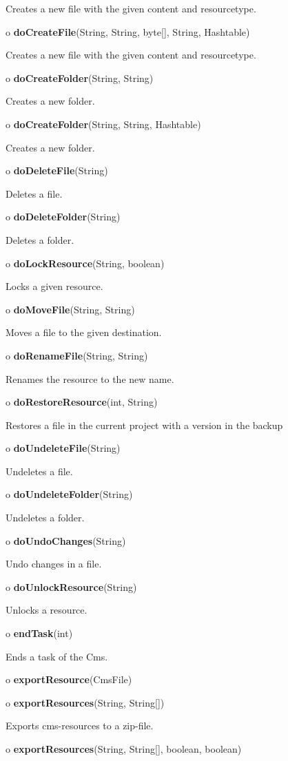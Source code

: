 \begin{description}
Creates a new file with the given content and resourcetype.\htmlBR
\item o {\bf doCreateFile}(String, String, byte[], String, Hashtable)

Creates a new file with the given content and resourcetype.
\item o {\bf doCreateFolder}(String, String)

Creates a new folder.
\item o {\bf doCreateFolder}(String, String, Hashtable)

Creates a new folder.
\item o {\bf doDeleteFile}(String)

Deletes a file.
\item o {\bf doDeleteFolder}(String)

Deletes a folder.
\item o {\bf doLockResource}(String, boolean)

Locks a given resource.
\item o {\bf doMoveFile}(String, String)

Moves a file to the given destination.
\item o {\bf doRenameFile}(String, String)

Renames the resource to the new name.
\item o {\bf doRestoreResource}(int, String)

Restores a file in the current project with a version in the backup
\item o {\bf doUndeleteFile}(String)

Undeletes a file.
\item o {\bf doUndeleteFolder}(String)

Undeletes a folder.
\item o {\bf doUndoChanges}(String)

Undo changes in a file.
\item o {\bf doUnlockResource}(String)

Unlocks a resource.
\item o {\bf endTask}(int)

Ends a task of the Cms.
\item o {\bf exportResource}(CmsFile)

\item o {\bf exportResources}(String, String[])

Exports cms-resources to a zip-file.
\item o {\bf exportResources}(String, String[], boolean, boolean)


\end{description}
